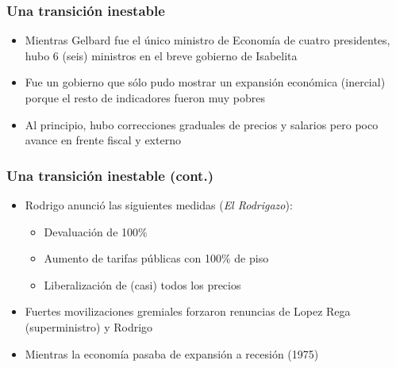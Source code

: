 \documentclass[14pt,aspectratio=169]{beamer}
\begin{document}
\begin{frame}\frametitle{Una transición inestable}
                 \begin{itemize}\itemsep 5pt \medskip
                 \item Mientras Gelbard fue el único ministro de Economía de cuatro
                   presidentes, hubo 6 (seis) ministros en el breve
                   gobierno de Isabelita
                   \item Fue un gobierno que sólo pudo mostrar un
                     expansión económica (inercial) porque el resto de
                     indicadores fueron muy pobres
                     \item Al principio, hubo correcciones graduales
                       de precios y salarios pero poco avance en
                       frente fiscal y externo
                 \end{itemize}
               \end{frame}
               

               
               \begin{frame}\frametitle{Una transición inestable (cont.)}
                 \begin{itemize}\itemsep 5pt \medskip
                 \item Rodrigo anunció las siguientes medidas
                   (\textit{El Rodrigazo}):
                   \begin{itemize}\itemsep 5pt \medskip
                   \item Devaluación de 100\%
                     \item Aumento de tarifas públicas con 100\% de
                       piso
                       \item Liberalización de (casi) todos los
                         precios
                       \end{itemize}
                       \item Fuertes movilizaciones gremiales forzaron
                         renuncias de Lopez Rega (superministro) y
                         Rodrigo
                         \item Mientras la economía pasaba de
                           expansión a recesión (1975)
                 \end{itemize}
               \end{frame}
\end{document}
